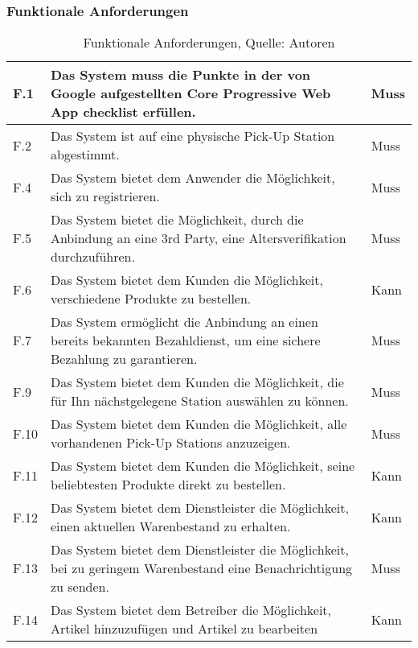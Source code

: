 \subsubsection{Funktionale Anforderungen}
\begin{table}[H]
	\setlength\extrarowheight{2pt} %
	\begin{tabularx}{\textwidth}{|l|X|l|}
		\hline
		F.1 & Das System muss die Punkte in der von Google aufgestellten Core Progressive Web App checklist erfüllen. \cite{pwaChecklist} & Muss \\
		\hline
		F.2 & Das System ist auf eine physische Pick-Up Station abgestimmt. & Muss \\
		\hline
		F.4 & Das System bietet dem Anwender die Möglichkeit, sich zu registrieren. & Muss \\
		\hline
		F.5 & Das System bietet die Möglichkeit, durch die Anbindung an eine 3rd Party, eine Altersverifikation durchzuführen.  & Muss \\
		\hline
		F.6 & Das System bietet dem Kunden die Möglichkeit, verschiedene Produkte zu bestellen. & Kann \\
		\hline
		F.7 & Das System ermöglicht die Anbindung an einen bereits bekannten Bezahldienst, um eine sichere Bezahlung zu garantieren. & Muss \\
		\hline
		F.9 & Das System bietet dem Kunden die Möglichkeit, die für Ihn nächstgelegene Station auswählen zu können.  & Muss \\
		\hline
		F.10 & Das System bietet dem Kunden die Möglichkeit, alle vorhandenen Pick-Up Stations anzuzeigen.  & Muss \\
		\hline
		F.11 & Das System bietet dem Kunden die Möglichkeit, seine beliebtesten Produkte direkt zu bestellen. & Kann \\
		\hline
		F.12 & Das System bietet dem Dienstleister die Möglichkeit, einen aktuellen Warenbestand zu erhalten. & Kann \\
		\hline
		F.13 & Das System bietet dem Dienstleister die Möglichkeit, bei zu geringem Warenbestand eine Benachrichtigung zu senden. & Muss \\
		\hline
		F.14 & Das System bietet dem Betreiber die Möglichkeit, Artikel hinzuzufügen und Artikel zu bearbeiten & Kann \\
		\hline
		
		
	\end{tabularx}
	\caption{ \label{tbl: FunktionaleAnforderungent}Funktionale Anforderungen, Quelle: Autoren}
\end{table}
